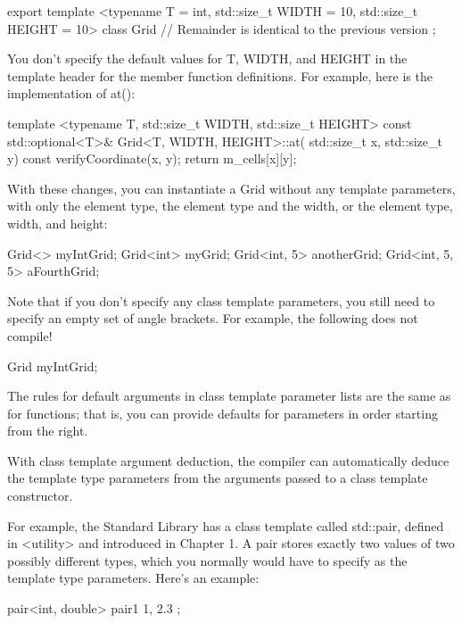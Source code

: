 \begin{cpp}
export template <typename T = int, std::size_t WIDTH = 10, std::size_t HEIGHT = 10>
class Grid
{
    // Remainder is identical to the previous version
};
\end{cpp}

You don’t specify the default values for T, WIDTH, and HEIGHT in the template header for the member function definitions. For example, here is the implementation of at():

\begin{cpp}
template <typename T, std::size_t WIDTH, std::size_t HEIGHT>
const std::optional<T>& Grid<T, WIDTH, HEIGHT>::at(
    std::size_t x, std::size_t y) const
{
    verifyCoordinate(x, y);
    return m_cells[x][y];
}
\end{cpp}

With these changes, you can instantiate a Grid without any template parameters, with only the element type, the element type and the width, or the element type, width, and height:

\begin{cpp}
Grid<> myIntGrid;
Grid<int> myGrid;
Grid<int, 5> anotherGrid;
Grid<int, 5, 5> aFourthGrid;
\end{cpp}

Note that if you don’t specify any class template parameters, you still need to specify an empty set of angle brackets. For example, the following does not compile!

\begin{cpp}
Grid myIntGrid;
\end{cpp}

The rules for default arguments in class template parameter lists are the same as for functions; that is, you can provide defaults for parameters in order starting from the right.


With class template argument deduction, the compiler can automatically deduce the template type parameters from the arguments passed to a class template constructor.

For example, the Standard Library has a class template called std::pair, defined in <utility> and introduced in Chapter 1. A pair stores exactly two values of two possibly different types, which you normally would have to specify as the template type parameters. Here’s an example:

\begin{cpp}
pair<int, double> pair1 { 1, 2.3 };
\end{cpp}

